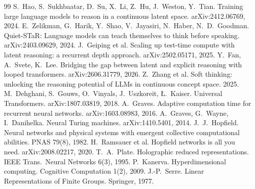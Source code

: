 \documentclass[11pt]{article}
\theoremstyle{definition}
\theoremstyle{remark}
\begin{document}
\begin{thebibliography}{99}\small
{} S.~Hao, S.~Sukhbaatar, D.~Su, X.~Li, Z.~Hu, J.~Weston, Y.~Tian. Training large language models to reason in a continuous latent space. arXiv:2412.06769, 2024.
 E.~Zelikman, G.~Harik, Y.~Shao, V.~Jayasiri, N.~Haber, N.~D.~Goodman. Quiet-STaR: Language models can teach themselves to think before speaking. arXiv:2403.09629, 2024.
 J.~Geiping et al. Scaling up test-time compute with latent reasoning: a recurrent depth approach. arXiv:2502.05171, 2025.
 Y.~Fan, A.~Svete, K.~Lee. Bridging the gap between latent and explicit reasoning with looped transformers. arXiv:2606.31779, 2026.
 Z.~Zhang et al. Soft thinking: unlocking the reasoning potential of LLMs in continuous concept space. 2025.
 M.~Dehghani, S.~Gouws, O.~Vinyals, J.~Uszkoreit, \L.~Kaiser. Universal Transformers. arXiv:1807.03819, 2018.
 A.~Graves. Adaptive computation time for recurrent neural networks. arXiv:1603.08983, 2016.
 A.~Graves, G.~Wayne, I.~Danihelka. Neural Turing machines. arXiv:1410.5401, 2014.
 J.~J.~Hopfield. Neural networks and physical systems with emergent collective computational abilities. PNAS 79(8), 1982.
 H.~Ramsauer et al. Hopfield networks is all you need. arXiv:2008.02217, 2020.
 T.~A.~Plate. Holographic reduced representations. IEEE Trans.\ Neural Networks 6(3), 1995.
 P.~Kanerva. Hyperdimensional computing. Cognitive Computation 1(2), 2009.
 J.-P.~Serre. Linear Representations of Finite Groups. Springer, 1977.
\end{thebibliography}
\end{document}
